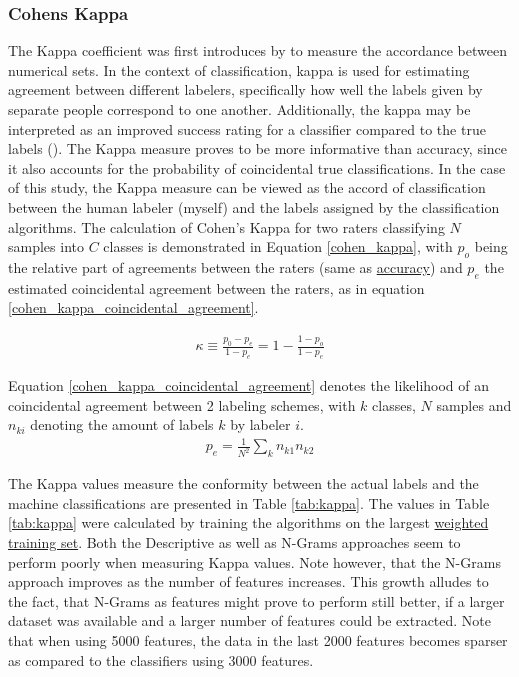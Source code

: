 		\subsubsection{Cohens Kappa}
			The Kappa coefficient was first introduces by \cite{cohen1960coefficient} to measure the accordance between numerical sets. In the context of classification, kappa is used for estimating agreement between different labelers, specifically how well the labels given by separate people correspond to one another. Additionally, the kappa may be interpreted as an improved success rating for a classifier compared to the true labels (\cite{castillo2011information}). The Kappa measure proves to be more informative than accuracy, since it also accounts for the probability of coincidental true classifications. In the case of this study, the Kappa measure can be viewed as the accord of classification between the human labeler (myself) and the labels assigned by the classification algorithms. The calculation of Cohen's Kappa for two raters classifying $ N $ samples into $ C $ classes is demonstrated in Equation \ref{cohen_kappa}, with $ p_o $ being the relative part of agreements between the raters (same as \hyperref[accuracy]{accuracy}) and $ p_e $ the estimated coincidental agreement between the raters, as in equation \ref{cohen_kappa_coincidental_agreement}. 
			
			\begin{equation}
				\begin{aligned}
					\kappa \equiv \frac{p_0-p_e}{1-p_e} = 1 - \frac{1-p_o}{1-p_e}
				\end{aligned}
				\label{cohen_kappa}
			\end{equation}
		
		Equation \ref{cohen_kappa_coincidental_agreement} denotes the likelihood of an coincidental agreement between 2 labeling schemes, with $ k $ classes, $ N $ samples and $ n_{ki} $ denoting the amount of labels $ k $ by labeler $ i $.
			\begin{equation}
				\begin{aligned}
					p_e = \frac{1}{N^2}\sum_k n_{k1}n_{k2}
				\end{aligned}
				\label{cohen_kappa_coincidental_agreement}
			\end{equation}
			
		The Kappa values measure the conformity between the actual labels and the machine classifications are presented in Table \ref{tab:kappa}. The values in Table \ref{tab:kappa} were calculated by training the algorithms on the largest \hyperref[sec:Weighted]{weighted training set}. Both the Descriptive as well as N-Grams approaches seem to perform poorly when measuring Kappa values. Note however, that the N-Grams approach improves as the number of features increases. This growth alludes to the fact, that N-Grams as features might prove to perform still better, if a larger dataset was available and a larger number of features could be extracted. Note that when using 5000 features, the data in the last 2000 features becomes sparser as compared to the classifiers using 3000 features.
		
